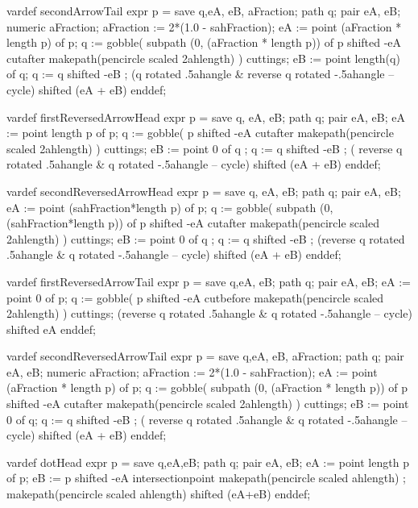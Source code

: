   vardef secondArrowTail expr p =
    save q,eA, eB, aFraction; path q; pair eA, eB; numeric aFraction;
    aFraction := 2*(1.0 - sahFraction);
    eA := point (aFraction * length p) of p;
    q := gobble(
      subpath (0, (aFraction * length p)) of p shifted -eA
      cutafter makepath(pencircle scaled 2ahlength)
    ) cuttings;
    eB := point length(q) of q;
    q := q shifted -eB ;
    (q rotated .5ahangle & reverse q rotated -.5ahangle -- cycle)
      shifted (eA + eB)
  enddef;

  
  vardef firstReversedArrowHead expr p =
    save q, eA, eB; path q; pair eA, eB;
    eA := point length p of p;
    q := gobble(
      p shifted -eA 
      cutafter makepath(pencircle scaled 2ahlength)
    ) cuttings;
    eB := point 0 of q ;
    q := q shifted -eB ;
    ( reverse q rotated .5ahangle & q rotated -.5ahangle -- cycle)
      shifted (eA + eB)
  enddef;

  vardef secondReversedArrowHead expr p =
    save q, eA, eB; path q; pair eA, eB;
    eA := point (sahFraction*length p) of p;
    q := gobble(
      subpath (0, (sahFraction*length p)) of p shifted -eA 
      cutafter makepath(pencircle scaled 2ahlength)
    ) cuttings;
    eB := point 0 of q ;
    q := q shifted -eB ;
    (reverse q rotated .5ahangle & q rotated -.5ahangle -- cycle)
      shifted (eA + eB)
  enddef;

  vardef firstReversedArrowTail expr p =
    save q,eA, eB; path q; pair eA, eB;
    eA := point 0 of p;
    q := gobble(
      p shifted -eA
      cutbefore makepath(pencircle scaled 2ahlength)
    ) cuttings;
    (reverse q rotated .5ahangle & q rotated -.5ahangle -- cycle)
      shifted eA
  enddef;
  
  vardef secondReversedArrowTail expr p =
    save q,eA, eB, aFraction; path q; pair eA, eB; numeric aFraction;
    aFraction := 2*(1.0 - sahFraction);
    eA := point (aFraction * length p) of p;
    q := gobble(
      subpath (0, (aFraction * length p)) of p shifted -eA
      cutafter makepath(pencircle scaled 2ahlength)
    ) cuttings;
    eB := point 0 of q;
    q := q shifted -eB ;
    ( reverse q rotated .5ahangle & q rotated -.5ahangle -- cycle)
      shifted (eA + eB)
  enddef;
  
  
  vardef dotHead expr p =
    save q,eA,eB; path q; pair eA, eB;
    eA := point length p of p;
    eB := p shifted -eA intersectionpoint makepath(pencircle scaled ahlength) ;
    makepath(pencircle scaled ahlength) shifted (eA+eB)
  enddef;
  
